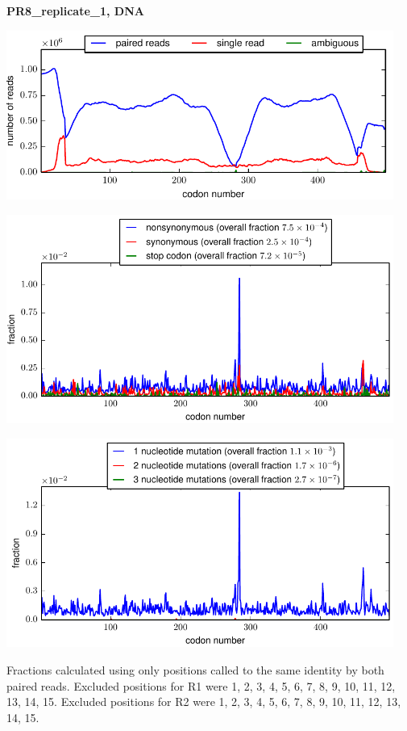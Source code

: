 \documentclass[10pt,letterpaper]{article}
\begin{document}
\centerline{\Large \bf PR8\_replicate\_1, DNA}
\vspace{0.1in}

\centerline{\includegraphics[width=5in]{PR8_replicate_1_DNA_codondepth.pdf}}
\vspace{0.1in}

\centerline{\includegraphics[width=5in]{PR8_replicate_1_DNA_syn-ns-dist.pdf}}
\vspace{0.1in}

\centerline{\includegraphics[width=5in]{PR8_replicate_1_DNA_nmutspercodon-dist.pdf}}
\vspace{0.1in}

Fractions calculated using only positions called to the same identity by both paired reads.  Excluded positions for R1 were 1, 2, 3, 4, 5, 6, 7, 8, 9, 10, 11, 12, 13, 14, 15. 
 Excluded positions for R2 were 1, 2, 3, 4, 5, 6, 7, 8, 9, 10, 11, 12, 13, 14, 15. 
\end{document}
